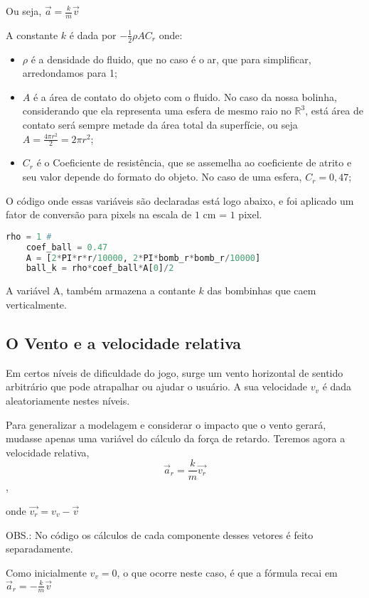 \documentclass[12pt,letterpaper]{article}
\begin{document}
Ou seja, $\vec{a}=\displaystyle\frac k m \vec{v}$

A constante $k$ é dada por $-\displaystyle\frac12\rho A C_r$ onde:

\begin{itemize}
    \item $\rho$ é a densidade do fluido, que no caso é o ar, que para simplificar, arredondamos para 1;
    \item $A$ é a área de contato do objeto com o fluido. No caso da nossa bolinha, considerando que ela representa uma esfera de mesmo raio no $\mathbb{R}^3$, está área de contato será sempre metade da área total da superfície, ou seja $A=\displaystyle\frac{4\pi r^2}2=2\pi r^2$;
    \item $C_r$ é o Coeficiente de resistência, que se assemelha ao coeficiente de atrito e seu valor depende do formato do objeto. No caso de uma esfera, $C_r=0,47$;
    
\end{itemize}
O código onde essas variáveis são declaradas está logo abaixo, e foi aplicado um fator de conversão para pixels na escala de $1$ cm = $1$ pixel.
\begin{lstlisting}[language=Python]
    rho = 1 #
    coef_ball = 0.47
    A = [2*PI*r*r/10000, 2*PI*bomb_r*bomb_r/10000]
    ball_k = rho*coef_ball*A[0]/2
\end{lstlisting}

A variável A, também armazena a contante $k$ das bombinhas que caem verticalmente.

\subsection*{O Vento e a velocidade relativa}

Em certos níveis de dificuldade do jogo, surge um vento horizontal de sentido arbitrário que pode atrapalhar ou ajudar o usuário. A sua velocidade $v_v$ é dada aleatoriamente nestes níveis.

Para generalizar a modelagem e considerar o impacto que o vento gerará, mudasse apenas uma variável do cálculo da força de retardo. Teremos agora a velocidade relativa,
$$\vec{a}_r=\displaystyle\frac k m\vec{v_r}$$,

onde $\vec{v_r}=v_v-\vec{v}$

OBS.: No código os cálculos de cada componente desses vetores é feito separadamente.

Como inicialmente $v_v=0$, o que ocorre neste caso, é que a fórmula recai em $\vec{a}_r=-\displaystyle\frac k m\vec{v}$
\end{document}
